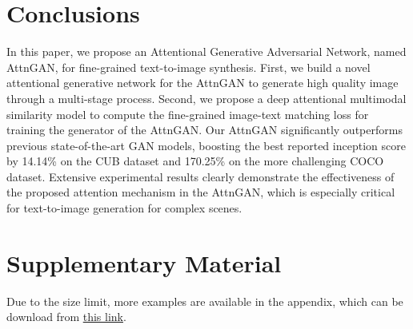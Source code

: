 \documentclass[10pt,twocolumn,letterpaper]{article}
\begin{document}
\section{Conclusions}
\vspace{-5pt}
In this paper, we propose an Attentional Generative Adversarial Network, named AttnGAN, for fine-grained text-to-image synthesis. First, we build a novel attentional generative network for the AttnGAN to generate high quality image through a multi-stage process. Second, we propose a deep attentional multimodal similarity model to compute the fine-grained image-text matching loss for training the generator of the AttnGAN. Our AttnGAN significantly outperforms previous state-of-the-art GAN models, boosting the best reported inception score by 14.14\% on the CUB dataset and 170.25\% on the more challenging COCO dataset. Extensive experimental results clearly demonstrate the effectiveness of the proposed attention mechanism in the AttnGAN, which is especially critical for text-to-image generation for complex scenes. 


{\footnotesize


}




\section*{Supplementary Material} 
Due to the size limit, more examples are available in the appendix, which can be  download from {\href{https://1drv.ms/b/s!Aj4exx_cRA4ghK5-kUG-EqH7hgknUA} {this link}}.
\end{document}
